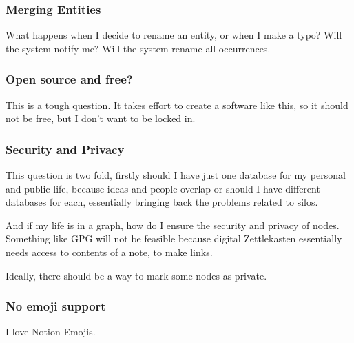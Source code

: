 \documentclass[11pt]{article}
\begin{document}
\subsubsection{Merging Entities}
\label{sec:orgaaa0eff}
What happens when I decide to rename an entity, or when I make a typo? Will the system notify me? Will the system rename all occurrences.
\subsubsection{Open source and free?}
\label{sec:orgb20187c}
This is a tough question. It takes effort to create a software like this, so it should not be free, but I don't want to be locked in.

\subsubsection{Security and Privacy}
\label{sec:orga35cd59}
This question is two fold, firstly should I have just one database for my personal and public life, because ideas and people overlap or should I have different databases for each, essentially bringing back the problems related to silos.

And if my life is in a graph, how do I ensure the security and privacy of nodes. Something like GPG will not be feasible because digital Zettlekasten essentially needs access to contents of a note, to make links.

Ideally, there should be a way to mark some nodes as private.

\subsubsection{No emoji support}
\label{sec:orged18fae}
I love Notion Emojis.
\end{document}
